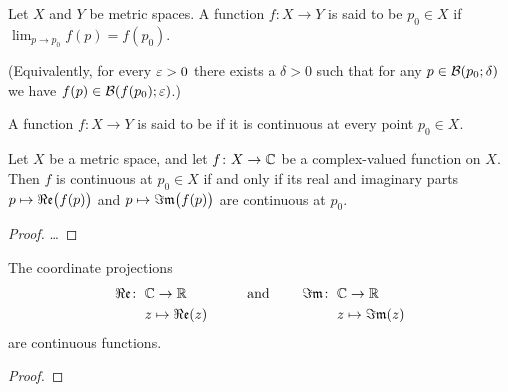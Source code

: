 %

\begin{definition}[Continuity]
  \label{def:continuous}
  Let $X$ and $Y$ be metric spaces.
  A function $f \colon X \to Y$ is said to be 
  $p_0 \in X$ if $\lim_{p \to p_0} f(p) = f(p_0)$.

  (Equivalently, for every $\varepsilon > 0$ there
  exists a $\delta > 0$ such that for any $p \in \mathcal{B}(p_0; \delta)$
  we have $f(p) \in \mathcal{B}(f(p_0); \varepsilon)$.)

  A function $f \colon X \to Y$ is said to be  if
  it is continuous at every point $p_0 \in X$.
\end{definition}

\begin{lemma}
  \label{lem:continuous_complex}
  Let $X$ be a metric space, and let $f \colon X \to \mathbb{C}$ be
  a complex-valued function on $X$. Then $f$ is continuous
  at $p_0 \in X$ if and only if its real and imaginary parts
  $p \mapsto \Re\mathfrak{e} \big( f(p) \big)$
  and $p \mapsto \Im\mathfrak{m} \big( f(p) \big)$ are continuous at $p_0$.
\end{lemma}
\begin{proof}
  \ldots
\end{proof}

\begin{corollary}
  \label{cor:coordinate_continuous}
  The coordinate projections
  \begin{align*}
    \Re\mathfrak{e} \colon \; & \mathbb{C} \to \mathbb{R}
    \qquad\qquad \text{ and } & \quad
    \Im\mathfrak{m} \colon \; & \mathbb{C} \to \mathbb{R} \\
    & z \mapsto \Re\mathfrak{e}(z) &
    & z \mapsto \Im\mathfrak{m}(z)
  \end{align*}
  are continuous functions.
\end{corollary}
\begin{proof}


\end{proof}


